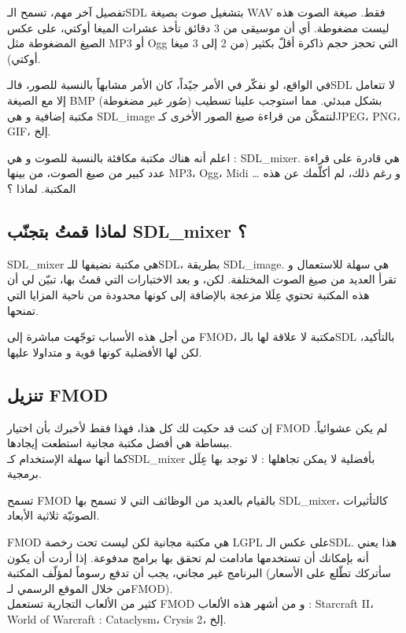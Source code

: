 تفصيل آخر مهم، تسمح الـ\textenglish{SDL}
بتشغيل صوت بصيغة
\textenglish{WAV}
فقط. صيغة الصوت هذه ليست مضغوطة. أي أن موسيقى من 3 دقائق تأخذ عشرات الميغا أوكتي،
على عكس الصيغ المضغوطة مثل
\textenglish{MP3}
أو
\textenglish{Ogg}
التي تحجز حجم ذاكرة أقلّ بكثير (من 2 إلى 3 ميغا أوكتي).

في الواقع، لو نفكّر في الأمر جيًداً، كان الأمر مشابهاً بالنسبة للصور، فالـ\textenglish{SDL}
لا تتعامل إلا مع الصيغة
\textenglish{BMP}
(صُور غير مضغوطة) بشكل مبدئي. مما استوجب علينا تسطيب مكتبة إضافية و هي
\textenglish{SDL\_image}
لنتمكّن من قراءة صيغ الصور الأخرى كـ\textenglish{JPEG}، \textenglish{PNG}، \textenglish{GIF}،
إلخ.

اعلم أنه هناك مكتبة مكافئة بالنسبة للصوت و هي :
\textenglish{SDL\_mixer}.
هي قادرة على قراءة عدد كبير من صيغ الصوت، من بينها
\textenglish{MP3}، \textenglish{Ogg}، \textenglish{Midi} \dots
و رغم ذلك، لم أكلّمك عن هذه المكتبة. لماذا ؟

\subsection{لماذا قمتُ بتجنّب \textenglish{SDL\_mixer} ؟}

\textenglish{SDL\_mixer}
هي مكتبة نضيفها للـ\textenglish{SDL}،
بطريقة 
\textenglish{SDL\_image}.
هي سهلة للاستعمال و تقرأ العديد من صيغ الصوت المختلفة. لكن، و بعد الاختبارات التي قمتُ بها، تبيّن لي أن هذه المكتبة تحتوي عِلَلا مزعجة بالإضافة إلى كونها محدودة من ناحية المزايا التي تمنحها.

من أجل هذه الأسباب توجّهت مباشرة إلى
\textenglish{FMOD}،
مكتبة لا علاقة لها بالـ\textenglish{SDL}
بالتأكيد، لكن لها الأفضلية كونها قوية و متداولا عليها.

\subsection{تنزيل \textenglish{FMOD}}

إن كنت قد حكيت لك كل هذا، فهذا فقط لأخبرك بأن اختيار
\textenglish{FMOD}
لم يكن عشوائياً. ببساطة هي أفضل مكتبة مجانية استطعت إيجادها.\\
كما أنها سهلة الإستخدام كـ\textenglish{SDL\_mixer}
بأفضلية لا يمكن تجاهلها : لا توجد بها عِلَل برمجية.

تسمح
\textenglish{FMOD}
بالقيام بالعديد من الوظائف التي لا تسمح بها
\textenglish{SDL\_mixer}،
كالتأثيرات الصوتيّة ثلاثية الأبعاد.

\begin{warning}
\textenglish{FMOD}
هي مكتبة مجانية لكن ليست تحت رخصة
\textenglish{LGPL}
على عكس الـ\textenglish{SDL}.
هذا يعني أنه بإمكانك أن تستخدمها مادامت لم تحقق بها برامج مدفوعة. إذا أردت أن يكون البرنامج غير مجاني، يجب أن تدفع رسوماً لمؤلّف المكتبة (سأتركك تطّلع على الأسعار من خلال الموقع الرسمي لـ\textenglish{FMOD}).\\
كثير من الألعاب التجارية تستعمل
\textenglish{FMOD}
و من أشهر هذه الألعاب :
\textenglish{Starcraft II}، \textenglish{World of Warcraft : Cataclysm}، \textenglish{Crysis 2}،
إلخ.
\end{warning}

